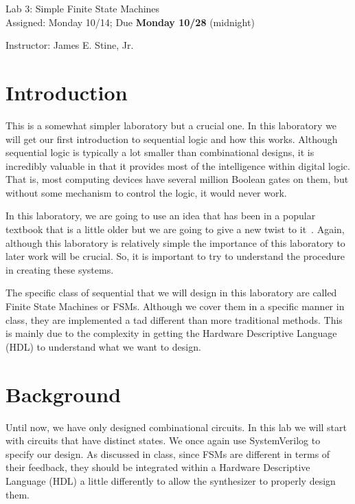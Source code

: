 \documentclass{article}
\newcommand{\myassignment}{Lab 3: Simple Finite State Machines}
\newcommand{\myduedate}{Assigned: Monday 10/14; Due \textbf{Monday 10/28} (midnight)}
\newcommand{\myinstructor}{Instructor: James E. Stine, Jr.}
\begin{document}
\begin{center}
  {\huge \myassignment} \\
  {\large \myduedate} \\
  \begin{flushright}
  \myinstructor \\
  \end{flushright}
\end{center}

\section{Introduction}

This is a somewhat simpler laboratory but a crucial one.  In this
laboratory we will get our first introduction to sequential logic and
how this works.  Although sequential logic is typically a lot smaller
than combinational designs, it is incredibly valuable in that it
provides most of the intelligence within digital logic.  That is, most
computing devices have several million Boolean gates on them, but
without some mechanism to control the logic, it would never work.

In this laboratory, we are going to use an idea that has been in a
popular textbook that is a little older but we are going to give a new
twist to it~\cite{DBLP:books/daglib/0067158}.  Again, although this
laboratory is relatively simple the importance of this laboratory to
later work will be crucial.  So, it is important to try to
understand the procedure in creating these systems.

The specific class of sequential that we will design in this
laboratory are called Finite State Machines or FSMs.  Although we cover them
in a specific manner in class, they are implemented a tad different
than more traditional methods.  This is mainly due to the complexity
in getting the Hardware Descriptive Language (HDL) to understand what
we want to design.

\section{Background}

Until now, we have only designed combinational circuits. In this lab
we will start with circuits that have distinct states. We once again use
SystemVerilog to specify our design.  As discussed in class, since
FSMs are different in terms of their feedback, they should be
integrated within a Hardware Descriptive Language (HDL) a little
differently to allow the synthesizer to properly design them.
\end{document}
